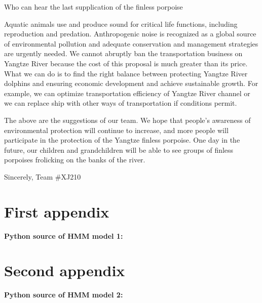 \documentclass[12pt]{article}  %
\begin{document}
\begin{letter}{Who can hear the last supplication of the finless porpoise}
 
 Aquatic animals use and produce sound for critical life functions, including reproduction and predation. Anthropogenic noise is recognized as a global source of environmental pollution and adequate conservation and management strategies are urgently needed. We cannot abruptly ban the transportation business on Yangtze River because the cost of this proposal is much greater than its price. What we can do is to find the right balance between protecting Yangtze River dolphins and ensuring economic development and achieve sustainable growth. For example, we can optimize transportation efficiency of Yangtze River channel or we can replace ship with other ways of transportation if conditions permit.
 
 
 The above are the suggestions of our team. We hope that people's awareness of environmental protection will continue to increase, and more people will participate in the protection of the Yangtze finless porpoise. One day in the future, our children and grandchildren will be able to see groups of finless porpoises frolicking on the banks of the river.
 
 Sincerely, Team $\#$XJ210
\end{letter}

\newpage

\begin{appendices}

\section{First appendix}


\textbf{\textcolor[rgb]{0.98,0.00,0.00}{Python source of HMM model 1:}}
{
}

\section{Second appendix}

\textcolor[rgb]{0.98,0.00,0.00}{\textbf{Python source of HMM model 2:}}


\end{appendices}
\end{document}
